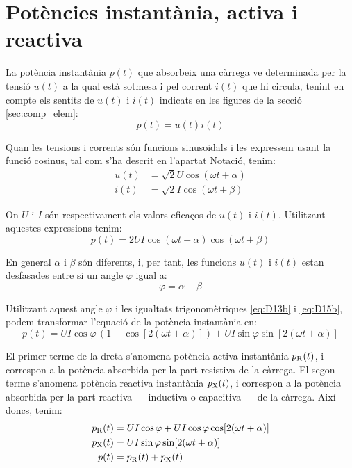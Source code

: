 \section{Potències instantània, activa i reactiva}\label{sec:pot-inst-act-react}

La potència instantània $p(t)$ que absorbeix una càrrega ve determinada per la tensió $u(t)$ a la qual està sotmesa i pel corrent $i(t)$ que hi circula, tenint en compte els sentits de $u(t)$ i $i(t)$ indicats en les figures de la secció \vref{sec:comp_elem}:
\begin{equation}
   p(t) = u(t) i(t)
\end{equation}

Quan les tensions i corrents són funcions sinusoidals i les expressem usant la funció cosinus, tal com s'ha descrit en l'apartat Notació, tenim:
\begin{align}
  u(t) &= \sqrt{2} U \cos(\omega t + \alpha) \\
  i(t) &= \sqrt{2} I \cos(\omega t + \beta)
\end{align}

On $U$ i $I$ són respectivament els valors eficaços de $u(t)$ i $i(t)$. Utilitzant aquestes expressions tenim:
\begin{equation}
   p(t) = 2 U I \cos(\omega t + \alpha) \cos(\omega t + \beta)
\end{equation}

En general $\alpha$ i $\beta$ són diferents, i, per tant, les funcions $u(t)$ i $i(t)$ estan desfasades entre si un angle $\varphi$ igual a:
\begin{equation}
  \varphi = \alpha - \beta
\end{equation}

Utilitzant aquest angle $\varphi$ i les igualtats trigonomètriques \eqref{eq:D13b} i \eqref{eq:D15b}, podem transformar l'equació de la potència instantània en:
\begin{equation}
   p(t) = U I \cos\varphi \,(1 + \cos [2 (\omega t + \alpha)]) + U I \sin\varphi \sin[2 (\omega t + \alpha)]
\end{equation}

El primer terme de la dreta  s'anomena potència activa instantània $p_\mathrm{R}(t)$, i correspon a la potència absorbida per la part resistiva de la càrrega. El segon terme  s'anomena potència reactiva instantània $p_\mathrm{X}(t)$, i correspon a la potència absorbida per la part reactiva --- inductiva o capacitiva --- de la càrrega. Així doncs, tenim:
\begin{subequations}
\begin{align}
  p_\mathrm{R}(t) &=  U I \cos\varphi + U I \cos\varphi \cos [2 (\omega t + \alpha)] \\
  p_\mathrm{X}(t) &=  U I \sin\varphi \sin[2 (\omega t + \alpha)] \\
    p(t) &= p_\mathrm{R}(t) + p_\mathrm{X}(t)
\end{align}
\end{subequations}
	
